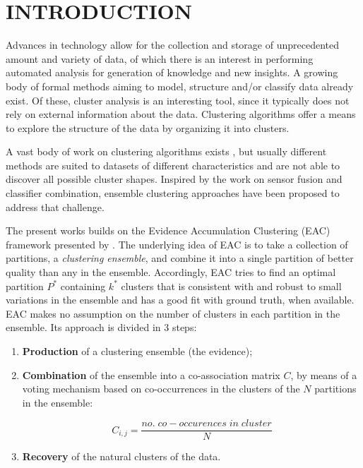 \section{\uppercase{Introduction}}
\label{sec:intro}


Advances in technology allow for the collection and storage of unprecedented amount and variety of data, of which there is an interest in performing automated analysis for generation of knowledge and new insights.
A growing body of formal methods aiming to model, structure and/or classify data already exist. %
Of these, cluster analysis is an interesting tool, since it typically does not rely on external information about the data.
Clustering algorithms offer a means to explore the structure of the data by organizing it into clusters.

A vast body of work on clustering algorithms exists \cite{Jain2010}, but usually different methods are suited to datasets of different characteristics and are not able to discover all possible cluster shapes.
Inspired by the work on sensor fusion and classifier combination, ensemble clustering approaches \cite{Fred2001,Fred2002,Strehl2002} have been proposed to address that challenge.

The present works builds on the Evidence Accumulation Clustering (EAC) framework presented by \cite{Fred2002,Fred2005}.
The underlying idea of EAC is to take a collection of partitions, a \emph{clustering ensemble}, and combine it into a single partition of better quality than any in the ensemble.
Accordingly, EAC tries to find an optimal partition $P^*$ containing $k^*$ clusters that is consistent with and robust to small variations in the ensemble and has a good fit with ground truth, when available.
EAC makes no assumption on the number of clusters in each partition in the ensemble.
Its approach is divided in 3 steps:

\begin{enumerate}
\item \textbf{Production} of a clustering ensemble (the evidence);
\item \textbf{Combination} of the ensemble into a co-association matrix $C$, by means of a voting mechanism based on co-occurrences in the clusters of the $N$ partitions in the ensemble:

\begin{center}
$$
C_{i,j} = \frac{no. \; co-occurences \; in \; cluster}{N}
$$
\end{center}

\item \textbf{Recovery} of the natural clusters of the data.
\end{enumerate}

